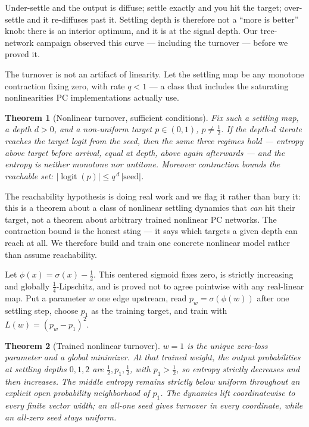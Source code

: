 \documentclass[11pt]{article}
\newtheorem{theorem}{Theorem}[section]
\begin{document}
Under-settle and the output is diffuse; settle exactly and you hit the target; over-settle
and it re-diffuses past it. Settling depth is therefore not a ``more is better'' knob:
there is an interior optimum, and it is at the signal depth. Our tree-network campaign
observed this curve --- including the turnover --- before we proved it.

The turnover is not an artifact of linearity. Let the settling map be any monotone
contraction fixing zero, with rate $q < 1$ --- a class that includes the saturating
nonlinearities PC implementations actually use.

\begin{theorem}[Nonlinear turnover, sufficient conditions]\label{thm:nonlin}
Fix such a settling map, a depth $d>0$, and a non-uniform target $p \in (0,1)$,
$p \neq \tfrac12$. If the depth-$d$ iterate reaches the target logit from the seed, then
the same three regimes hold --- entropy above target before arrival, equal at depth,
above again afterwards --- and the entropy is neither monotone nor antitone. Moreover
contraction bounds the reachable set: $|\operatorname{logit}(p)| \le q^{\,d}\,|\text{seed}|$.
\end{theorem}

The reachability hypothesis is doing real work and we flag it rather than bury it: this is
a theorem about a class of nonlinear settling dynamics that \emph{can} hit their target,
not a theorem about arbitrary trained nonlinear PC networks. The contraction bound is the
honest sting --- it says which targets a given depth can reach at all. We therefore build
and train one concrete nonlinear model rather than assume reachability.

Let $\phi(x)=\sigma(x)-\tfrac12$. This centered sigmoid fixes zero, is strictly
increasing and globally $\tfrac14$-Lipschitz, and is proved not to agree pointwise with
any real-linear map. Put a parameter $w$ one edge upstream, read
$p_w=\sigma(\phi(w))$ after one settling step, choose $p_1$ as the training target, and
train with $L(w)=(p_w-p_1)^2$.

\begin{theorem}[Trained nonlinear turnover]\label{thm:trainednonlin}
$w=1$ is the unique zero-loss parameter and a global minimizer. At that trained weight,
the output probabilities at settling depths $0,1,2$ are
$\tfrac12,p_1,\tfrac12$, with $p_1>\tfrac12$, so entropy strictly decreases and then
increases. The middle entropy remains strictly below uniform throughout an explicit
open probability neighborhood of $p_1$. The dynamics lift coordinatewise to every
finite vector width; an all-one seed gives turnover in every coordinate, while an
all-zero seed stays uniform.
\end{theorem}
\end{document}

